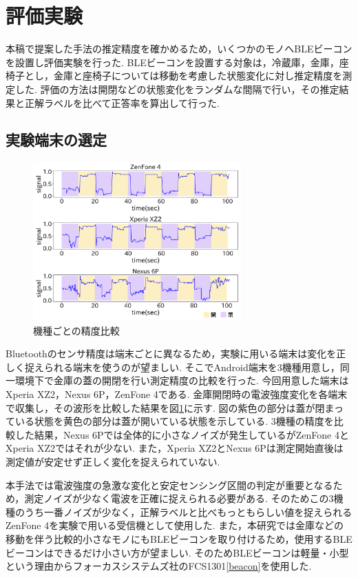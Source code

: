 \documentclass[Japanese]{dicomopapers}
\begin{document}
\section{評価実験}

本稿で提案した手法の推定精度を確かめるため，いくつかのモノへBLEビーコンを設置し評価実験を行った.
BLEビーコンを設置する対象は，冷蔵庫，金庫，座椅子とし，金庫と座椅子については移動を考慮した状態変化に対し推定精度を測定した.
評価の方法は開閉などの状態変化をランダムな間隔で行い，その推定結果と正解ラベルを比べて正答率を算出して行った.

\subsection{実験端末の選定}

\begin{figure}[tbh]
    \centering
    \includegraphics[width=8cm]{mix.png}
    \caption{機種ごとの精度比較}
    \label{multi-data}
\end{figure}

Bluetoothのセンサ精度は端末ごとに異なるため，実験に用いる端末は変化を正しく捉えられる端末を使うのが望ましい.
そこでAndroid端末を3機種用意し，同一環境下で金庫の蓋の開閉を行い測定精度の比較を行った.
今回用意した端末はXperia XZ2，Nexus 6P，ZenFone 4である.
金庫開閉時の電波強度変化を各端末で収集し，その波形を比較した結果を図\ref{multi-data}に示す.
図の紫色の部分は蓋が閉まっている状態を黄色の部分は蓋が開いている状態を示している.
3機種の精度を比較した結果，Nexus 6Pでは全体的に小さなノイズが発生しているがZenFone 4とXperia XZ2ではそれが少ない.
また，Xperia XZ2とNexus 6Pは測定開始直後は測定値が安定せず正しく変化を捉えられていない.

本手法では電波強度の急激な変化と安定センシング区間の判定が重要となるため，測定ノイズが少なく電波を正確に捉えられる必要がある.
そのためこの3機種のうち一番ノイズが少なく，正解ラベルと比べもっともらしい値を捉えられるZenFone 4を実験で用いる受信機として使用した.
また，本研究では金庫などの移動を伴う比較的小さなモノにもBLEビーコンを取り付けるため，使用するBLEビーコンはできるだけ小さい方が望ましい.
そのためBLEビーコンは軽量・小型という理由からフォーカスシステムズ社のFCS1301\ref{beacon}を使用した.
\end{document}

